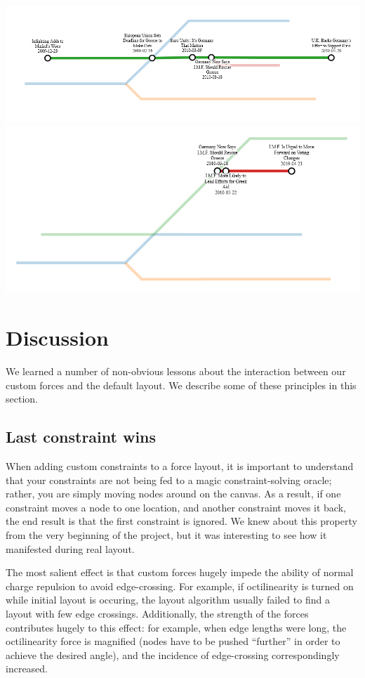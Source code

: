 \documentclass{chi2009}
\begin{document}
\includegraphics[width=\columnwidth]{Metro3.png}
\includegraphics[width=\columnwidth]{Metro4.png}

\section{Discussion}

We learned a number of non-obvious lessons about the interaction between
our custom forces and the default layout.  We describe some of these
principles in this section.

\subsection{Last constraint wins}

When adding custom constraints to a force layout, it is important to
understand that your constraints are not being fed to a magic
constraint-solving oracle; rather, you are simply moving nodes around on
the canvas.  As a result, if one constraint moves a node to one
location, and another constraint moves it back, the end result is that
the first constraint is ignored.  We knew about this property from the
very beginning of the project, but it was interesting to see how it manifested
during real layout.

The most salient effect is that custom forces hugely impede the ability
of normal charge repulsion to avoid edge-crossing.  For example, if
octilinearity is turned on while initial layout is occuring, the layout
algorithm usually failed to find a layout with few edge crossings.
Additionally, the strength of the forces contributes hugely to this effect:
for example, when edge lengths were long, the octilinearity force is magnified
(nodes have to be pushed ``further'' in order to achieve the desired angle),
and the incidence of edge-crossing correspondingly increased.
\end{document}

